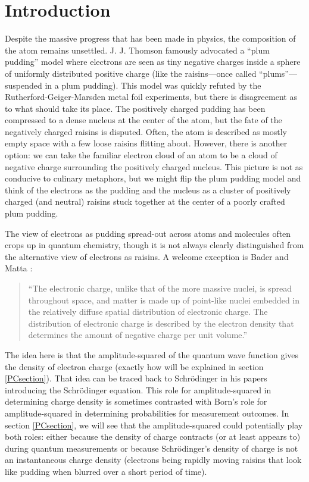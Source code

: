 \documentclass[onecolumn,secnumarabic,amsmath,amssymb,balancelastpage,nofootinbib]{article}
\begin{document}
\tableofcontents
\newpage





\section{Introduction}\label{introsec}

Despite the massive progress that has been made in physics, the composition of the atom remains unsettled.  J. J. Thomson \cite{thomson1904} famously advocated a ``plum pudding'' model where electrons are seen as tiny negative charges inside a sphere of uniformly distributed positive charge (like the raisins---once called ``plums''---suspended in a plum pudding).  This model was quickly refuted by the Rutherford-Geiger-Marsden metal foil experiments, but there is disagreement as to what should take its place.  The positively charged pudding has been compressed to a dense nucleus at the center of the atom, but the fate of the negatively charged raisins is disputed.  Often, the atom is described as mostly empty space with a few loose raisins flitting about.  However, there is another option: we can take the familiar electron cloud of an atom to be a cloud of negative charge surrounding the positively charged nucleus.  This picture is not as conducive to culinary metaphors, but we might flip the plum pudding model and think of the electrons as the pudding and the nucleus as a cluster of positively charged (and neutral) raisins stuck together at the center of a poorly crafted plum pudding.

The view of electrons as pudding spread-out across atoms and molecules often crops up in quantum chemistry, though it is not always clearly distinguished from the alternative view of electrons as raisins.  A welcome exception is Bader and Matta \cite{bader2013}:
\begin{quote}
``The electronic charge, unlike that of the more massive nuclei, is spread throughout space, and matter is made up of point-like nuclei embedded in the relatively diffuse spatial distribution of electronic charge. The distribution of electronic charge is described by the electron density that determines the amount of negative charge per unit volume.'' \cite[pg.\ 255]{bader2013}
\end{quote}
The idea here is that the amplitude-squared of the quantum wave function gives the density of electron charge (exactly how will be explained in section \ref{PCsection}).  That idea can be traced back to Schr\"{o}dinger in his papers introducing the Schr\"{o}dinger equation.  This role for amplitude-squared in determining charge density is sometimes contrasted with Born's role for amplitude-squared in determining probabilities for measurement outcomes.  In section \ref{PCsection}, we will see that the amplitude-squared could potentially play both roles: either because the density of charge contracts (or at least appears to) during quantum measurements or because Schr\"{o}dinger's density of charge is not an instantaneous charge density (electrons being rapidly moving raisins that look like pudding when blurred over a short period of time).
\end{document}
